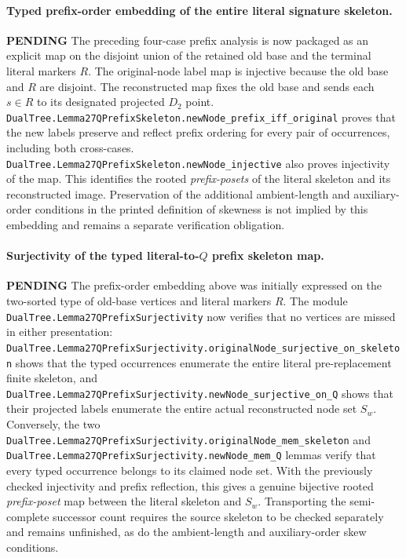 \documentclass[11pt]{article}
\newcommand{\todo}{\textcolor{gray!70!black}{\textbf{PENDING}}}
\newcommand{\lean}[1]{\texttt{#1}}
\begin{document}
\paragraph{Typed prefix-order embedding of the entire literal signature skeleton.} \todo
The preceding four-case prefix analysis is now packaged as an
explicit map on the disjoint union of the retained old base and
the terminal literal markers $R$.  The original-node label map is
injective because the old base and $R$ are disjoint.
The reconstructed map fixes the old base and sends each $s\in R$
to its designated projected $D_2$ point.
\lean{DualTree.Lemma27QPrefixSkeleton.newNode_prefix_iff_original}
proves that the new labels preserve and reflect prefix ordering
for every pair of occurrences, including both cross-cases.
\lean{DualTree.Lemma27QPrefixSkeleton.newNode_injective}
also proves injectivity of the map.
This identifies the rooted \emph{prefix-posets} of the literal
skeleton and its reconstructed image.  Preservation of the
additional ambient-length and auxiliary-order conditions in
the printed definition of skewness is not implied by this
embedding and remains a separate verification obligation.


\paragraph{Surjectivity of the typed literal-to-$Q$ prefix skeleton map.} \todo
The prefix-order embedding above was initially expressed on the
two-sorted type of old-base vertices and literal markers $R$.
The module \lean{DualTree.Lemma27QPrefixSurjectivity} now verifies
that no vertices are missed in either presentation:
\lean{DualTree.Lemma27QPrefixSurjectivity.originalNode_surjective_on_skeleton}
shows that the typed occurrences enumerate the entire literal
pre-replacement finite skeleton, and
\lean{DualTree.Lemma27QPrefixSurjectivity.newNode_surjective_on_Q}
shows that their projected labels enumerate the entire actual
reconstructed node set $S_w$.
Conversely, the two
\lean{DualTree.Lemma27QPrefixSurjectivity.originalNode_mem_skeleton}
and \lean{DualTree.Lemma27QPrefixSurjectivity.newNode_mem_Q}
lemmas verify that every typed occurrence belongs to its
claimed node set.
With the previously checked injectivity and prefix reflection,
this gives a genuine bijective rooted \emph{prefix-poset} map
between the literal skeleton and $S_w$.  Transporting the
semi-complete successor count requires the source skeleton
to be checked separately and remains unfinished, as do
the ambient-length and auxiliary-order skew conditions.
\end{document}
